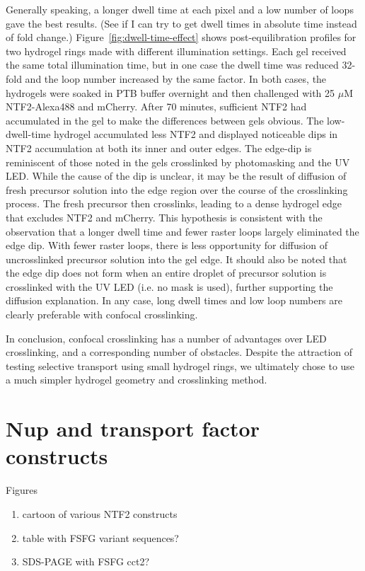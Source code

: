 Generally speaking, a longer dwell time at each pixel and a low number of loops gave the best results.  (See if I can try to get dwell times in absolute time instead of fold change.)  Figure~\ref{fig:dwell-time-effect} shows post-equilibration profiles for two hydrogel rings made with different illumination settings.  Each gel received the same total illumination time, but in one case the dwell time was reduced 32-fold and the loop number increased by the same factor.  In both cases, the hydrogels were soaked in PTB buffer overnight and then challenged with 25 $\mu$M NTF2-Alexa488 and mCherry.  After 70 minutes, sufficient NTF2 had accumulated in the gel to make the differences between gels obvious.  The low-dwell-time hydrogel accumulated less NTF2 and displayed noticeable dips in NTF2 accumulation at both its inner and outer edges.  The edge-dip is reminiscent of those noted in the gels crosslinked by photomasking and the UV LED.  While the cause of the dip is unclear, it may be the result of diffusion of fresh precursor solution into the edge region over the course of the crosslinking process.  The fresh precursor then crosslinks, leading to a dense hydrogel edge that excludes NTF2 and mCherry.  This hypothesis is consistent with the observation that a longer dwell time and fewer raster loops largely eliminated the edge dip.  With fewer raster loops, there is less opportunity for diffusion of uncrosslinked precursor solution into the gel edge.  It should also be noted that the edge dip does not form when an entire droplet of precursor solution is crosslinked with the UV LED (i.e. no mask is used), further supporting the diffusion explanation.  In any case, long dwell times and low loop numbers are clearly preferable with confocal crosslinking.

In conclusion, confocal crosslinking has a number of advantages over LED crosslinking, and a corresponding number of obstacles.  Despite the attraction of testing selective transport using small hydrogel rings, we ultimately chose to use a much simpler hydrogel geometry and crosslinking method.

\section{Nup and transport factor constructs}
Figures
\begin{enumerate}
\item cartoon of various NTF2 constructs
\item table with FSFG variant sequences?
\item SDS-PAGE with FSFG cct2?
\end{enumerate}

